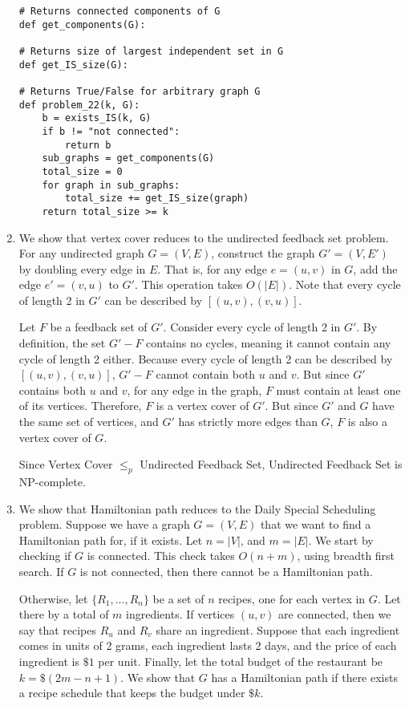 \documentclass[oneside, 12pt]{article}
\begin{document}
\begin{enumerate}
\begin{lstlisting}
# Returns connected components of G
def get_components(G):
	
# Returns size of largest independent set in G
def get_IS_size(G):

# Returns True/False for arbitrary graph G
def problem_22(k, G):
	b = exists_IS(k, G)
	if b != "not connected":
		return b
	sub_graphs = get_components(G)
	total_size = 0
	for graph in sub_graphs:
		total_size += get_IS_size(graph)
	return total_size >= k
\end{lstlisting}
\clearpage
\setcounter{enumi}{30}
\item
We show that vertex cover reduces to the undirected feedback set problem. For any undirected graph $G = (V, E)$, construct the graph $G' = (V, E')$ by doubling every edge in $E$. That is, for any edge $e = (u, v)$ in $G$, add the edge $e' = (v, u)$ to $G'$. This operation takes $O(|E|)$. Note that every cycle of length 2 in $G'$ can be described by $[(u, v), (v, u)]$. 

Let $F$ be a feedback set of $G'$. Consider every cycle of length 2 in $G'$. By definition, the set $G' - F$ contains no cycles, meaning it cannot contain any cycle of length 2 either. Because every cycle of length 2 can be described by $[(u, v), (v, u)]$, $G'-F$ cannot contain both $u$ and $v$. But since $G'$ contains both $u$ and $v$, for any edge in the graph, $F$ must contain at least one of its vertices. Therefore, $F$ is a vertex cover of $G'$. But since $G'$ and $G$ have the same set of vertices, and $G'$ has strictly more edges than $G$, $F$ is also a vertex cover of $G$.

Since Vertex Cover $\le_p$ Undirected Feedback Set, Undirected Feedback Set is NP-complete. 
\clearpage
\setcounter{enumi}{35}
\item 
We show that Hamiltonian path reduces to the Daily Special Scheduling problem. Suppose we have a graph $G = (V, E)$ that we want to find a Hamiltonian path for, if it exists. Let $n = |V|$, and $m = |E|$. We start by checking if $G$ is connected. This check takes $O(n+ m)$, using breadth first search. If $G$ is not connected, then there cannot be a Hamiltonian path.

Otherwise, let $\{R_1, ..., R_n\}$ be a set of $n$ recipes, one for each vertex in $G$. Let there by a total of $m$ ingredients. If vertices $(u, v)$ are connected, then we say that recipes $R_u$ and $R_v$ share an ingredient. Suppose that each ingredient comes in units of 2 grams, each ingredient lasts 2 days, and the price of each ingredient is $\$1$ per unit. Finally, let the total budget of the restaurant be $k = \$(2m - n + 1)$. We show that $G$ has a Hamiltonian path if there exists a recipe schedule that keeps the budget under $\$k$. 


\end{enumerate}
\end{document}
